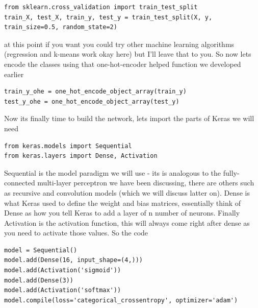 \documentclass[a4paper]{article}
\begin{document}
\begin{verbatim}
from sklearn.cross_validation import train_test_split
train_X, test_X, train_y, test_y = train_test_split(X, y, train_size=0.5, random_state=2)
\end{verbatim}
at this point if you want you could try other machine learning algorithms (regression and k-means work okay here) but I'll leave that to you. So now lets encode the classes using that one-hot-encoder helped function we developed earlier
\begin{verbatim}
train_y_ohe = one_hot_encode_object_array(train_y)
test_y_ohe = one_hot_encode_object_array(test_y)
\end{verbatim}
Now its finally time to build the network, lets import the parts of Keras we will need
\begin{verbatim}
from keras.models import Sequential
from keras.layers import Dense, Activation
\end{verbatim}
Sequential is the model paradigm we will use - its is analogous to the fully-connected multi-layer perceptron we have been discussing, there are others such as recursive and convolution models (which we will discuss latter on). Dense is what Keras used to define the weight and bias matrices, essentially think of Dense as how you tell Keras to add a layer of n number of neurons. Finally Activation is the activation function, this will always come right after dense as you need to activate those values. So the code
\begin{verbatim}
model = Sequential()
model.add(Dense(16, input_shape=(4,)))
model.add(Activation('sigmoid'))
model.add(Dense(3))
model.add(Activation('softmax'))
model.compile(loss='categorical_crossentropy', optimizer='adam')
\end{verbatim}
\end{document}
